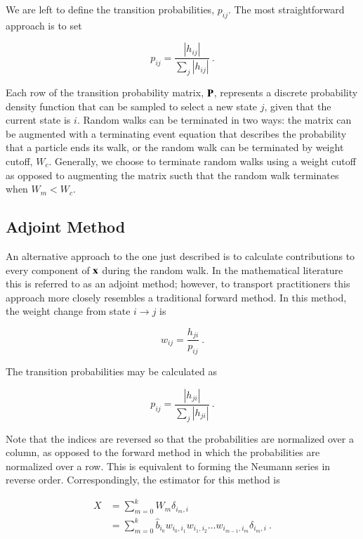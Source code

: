 \documentclass[preprint,12pt]{elsarticle}
\newcommand{\vx}{\ensuremath{\ve{x}}}
\newcommand{\vP}{\ensuremath{\ve{P}}}
\begin{document}
We are left to define the transition probabilities, $p_{ij}$. The most
straightforward approach is to set

\begin{equation}
  p_{ij} = \frac{|h_{ij}|}{\sum_{j}|h_{ij}|}\:.
  \label{eq:probability}
\end{equation}

Each row of the transition probability matrix, $\vP$, represents a
discrete probability density function that can be sampled to select a
new state $j$, given that the current state is $i$.  Random walks can
be terminated in two ways: the matrix can be augmented with a
terminating event equation that describes the probability that a
particle ends its walk, or the random walk can be terminated by weight
cutoff, $W_c$.  Generally, we choose to terminate random walks using a
weight cutoff as opposed to augmenting the matrix sucth that the
random walk terminates when $W_m < W_c$.

\subsection{Adjoint Method}
\label{sec:adjoint-method}

An alternative approach to the one just described is to calculate
contributions to every component of $\vx$ during the random walk.  In
the mathematical literature this is referred to as an adjoint method;
however, to transport practitioners this approach more closely
resembles a traditional forward method.  In this method, the weight
change from state $i\rightarrow j$ is

\begin{equation}
  w_{ij} = \frac{h_{ji}}{p_{ij}}\:.
  \label{eq:adjoint-weight}
\end{equation}

The transition probabilities may be calculated as

\begin{equation}
  p_{ij} = \frac{|h_{ji}|}{\sum_{j}|h_{ji}|}\:.
  \label{eq:adjoint-probability}
\end{equation}

Note that the indices are reversed so that the probabilities are
normalized over a column, as opposed to the forward method in which
the probabilities are normalized over a row.  This is equivalent to
forming the Neumann series in reverse order.  Correspondingly, the
estimator for this method is

\begin{equation}
  \begin{split}
    X &= \sum_{m=0}^{k}W_m\delta_{i_m,i}\\
    &= \sum_{m=0}^{k}\hat{b}_{i_0}w_{i_0,i_1}w_{i_1,i_2}\ldots
                                  w_{i_{m-1},i_m}\delta_{i_m,i}\:.
  \end{split}
  \label{eq:adjoint-tally}
\end{equation}
\end{document}
